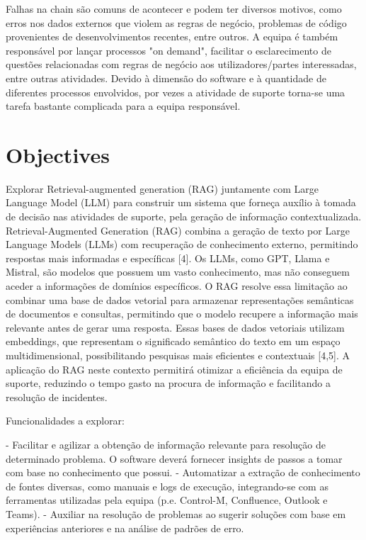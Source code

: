  Falhas na chain são comuns de acontecer e podem ter diversos motivos, como erros nos dados externos que
 violem as regras de negócio, problemas de código provenientes de desenvolvimentos recentes, entre outros.
 A equipa é também responsável por lançar processos "on demand", facilitar o esclarecimento de questões
 relacionadas com regras de negócio aos utilizadores/partes interessadas, entre outras atividades.
 Devido à dimensão do software e à quantidade de diferentes processos envolvidos, por vezes a atividade de
 suporte torna-se uma tarefa bastante complicada para a equipa responsável.



\section{Objectives}

Explorar Retrieval-augmented generation (RAG) juntamente com Large Language Model (LLM) para construir
 um sistema que forneça auxílio à tomada de decisão nas atividades de suporte, pela geração de informação
 contextualizada.
 Retrieval-Augmented Generation (RAG) combina a geração de texto por Large Language Models (LLMs) com
 recuperação de conhecimento externo, permitindo respostas mais informadas e específicas [4].
 Os LLMs, como GPT, Llama e Mistral, são modelos que possuem um vasto conhecimento, mas não
 conseguem aceder a informações de domínios específicos. O RAG resolve essa limitação ao combinar uma
 base de dados vetorial para armazenar representações semânticas de documentos e consultas, permitindo
 que o modelo recupere a informação mais relevante antes de gerar uma resposta. Essas bases de dados
 vetoriais utilizam embeddings, que representam o significado semântico do texto em um espaço
 multidimensional, possibilitando pesquisas mais eficientes e contextuais [4,5].
 A aplicação do RAG neste contexto permitirá otimizar a eficiência da equipa de suporte, reduzindo o tempo
 gasto na procura de informação e facilitando a resolução de incidentes.

 Funcionalidades a explorar:

 - Facilitar e agilizar a obtenção de informação relevante para resolução de determinado problema. O
 software deverá fornecer insights de passos a tomar com base no conhecimento que possui.
 - Automatizar a extração de conhecimento de fontes diversas, como manuais e logs de execução,
 integrando-se com as ferramentas utilizadas pela equipa (p.e. Control-M, Confluence, Outlook e Teams).
 - Auxiliar na resolução de problemas ao sugerir soluções com base em experiências anteriores e na
 análise de padrões de erro.


